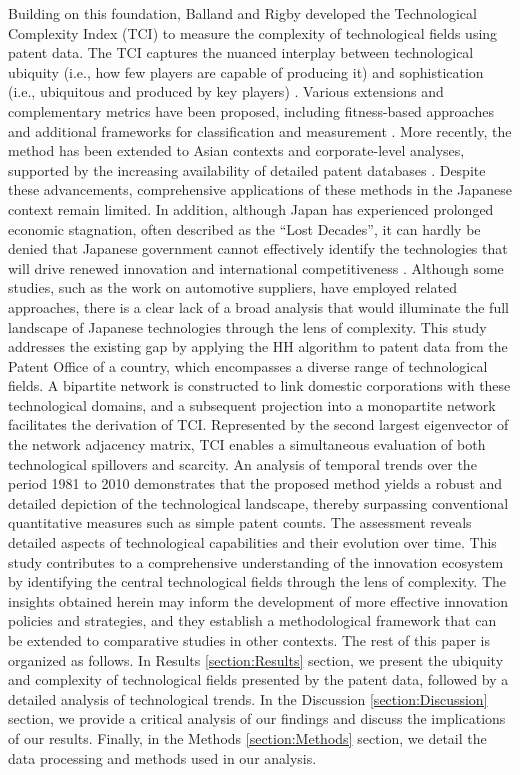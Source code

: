 \documentclass[fleqn,10pt]{wlscirep}
\begin{document}
Building on this foundation, Balland and Rigby \cite{Balland2016} developed the Technological Complexity Index (TCI) to measure the complexity of technological fields using patent data. 
The TCI captures the nuanced interplay between technological ubiquity (i.e., how few players are capable of producing it) and sophistication (i.e., ubiquitous and produced by key players) \cite{Balland2018}. 
Various extensions and complementary metrics have been proposed, including fitness-based approaches \cite{Tacchella2012,Wu2016,Albeaik2017} and additional frameworks for classification and measurement \cite{Schmoch2008,Soete1987,Balassa1965,Mealy2019,PintarEssletzbichler2022}.
More recently, the method has been extended to Asian contexts and corporate-level analyses, supported by the increasing availability of detailed patent databases \cite{Jun2023,Dong2021}. 
Despite these advancements, comprehensive applications of these methods in the Japanese context remain limited. 
In addition, although Japan has experienced prolonged economic stagnation, often described as the “Lost Decades”, it can hardly be denied that Japanese government cannot effectively identify the technologies that will drive renewed innovation and international competitiveness \cite{Kobayashi2024}. 
Although some studies, such as the work on automotive suppliers\cite{Kito2018}, have employed related approaches, there is a clear lack of a broad analysis that would illuminate the full landscape of Japanese technologies through the lens of complexity.
This study addresses the existing gap by applying the HH algorithm to patent data from the Patent Office of a country, which encompasses a diverse range of technological fields.
A bipartite network is constructed to link domestic corporations with these technological domains, and a subsequent projection into a monopartite network facilitates the derivation of TCI.
Represented by the second largest eigenvector of the network adjacency matrix, TCI enables a simultaneous evaluation of both technological spillovers and scarcity.
An analysis of temporal trends over the period 1981 to 2010 demonstrates that the proposed method yields a robust and detailed depiction of the technological landscape, thereby surpassing conventional quantitative measures such as simple patent counts.
The assessment reveals detailed aspects of technological capabilities and their evolution over time.
This study contributes to a comprehensive understanding of the innovation ecosystem by identifying the central technological fields through the lens of complexity.
The insights obtained herein may inform the development of more effective innovation policies and strategies, and they establish a methodological framework that can be extended to comparative studies in other contexts.
The rest of this paper is organized as follows. 
In Results \ref{section:Results} section, we present the ubiquity and complexity of technological fields presented by the patent data, followed by a detailed analysis of technological trends.
In the Discussion \ref{section:Discussion} section, we provide a critical analysis of our findings and discuss the implications of our results.
Finally, in the Methods \ref{section:Methods} section, we detail the data processing and methods used in our analysis.
\end{document}
